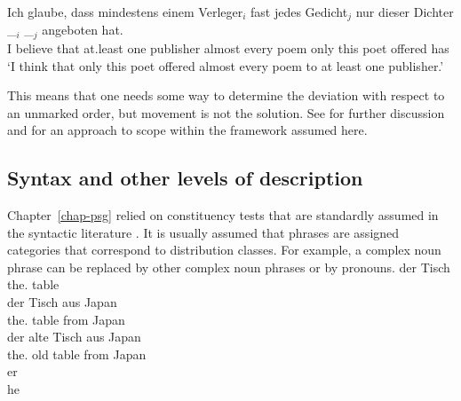 \ea
\gll Ich glaube, dass mindestens einem Verleger$_i$ fast jedes Gedicht$_j$ nur dieser Dichter \_$_i$ \_$_j$ angeboten hat.\\
     I believe that at.least one publisher almost every poem only this poet {} {} offered has\\
\glt `I think that only this poet offered almost every poem to at least one publisher.'
\z

This means that one needs some way to determine the deviation with respect to an unmarked order, but
movement is not the solution. See  for further discussion and
\citet{Kiss2001a} for an approach to scope within the framework assumed here.

\subsection{Syntax and other levels of description}
\label{sec-down-to-earth-syntax}

Chapter~\ref{chap-psg} relied on constituency tests that are standardly assumed in the syntactic
literature \parencites[24--31]{Borsley91a}[35--36]{Haegeman94a-u}[20--23]{HP2002a-ed}[29--33]{SWB2003a}[19--22]{KS2008a-u}[Chapter~1.3]{MuellerGT-Eng}{MyP2022a}.
It is usually assumed that phrases are assigned categories that correspond to distribution
classes. For example, a complex noun phrase can be replaced by other complex noun phrases or by
pronouns. 
\eal
\label{ex-np-tisch}
\ex 
\gll der Tisch\\
     the.\NOM{} table\\
\ex 
\gll der Tisch aus Japan\\
     the.\NOM{} table from Japan\\
\ex 
\gll der alte Tisch aus Japan\\
     the.\NOM{} old  table from Japan\\
\ex 
\gll er\\
     he\\
\zl

